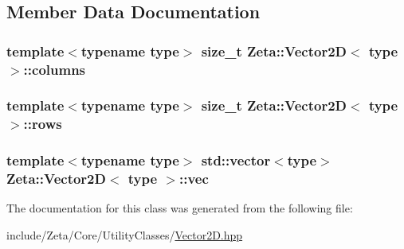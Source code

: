 \subsection{Member Data Documentation}
\hypertarget{classZeta_1_1Vector2D_abd3d1cc04c6700981eb80163689a9f26}{
\subsubsection[{columns}]{\setlength{\rightskip}{0pt plus 5cm}template$<$typename type$>$ size\+\_\+t {\bf Zeta\+::\+Vector2\+D}$<$ type $>$\+::columns\hspace{0.3cm}{\ttfamily [private]}}}\label{classZeta_1_1Vector2D_abd3d1cc04c6700981eb80163689a9f26}
\hypertarget{classZeta_1_1Vector2D_a2aca070e9e69cc69174038b3dd563826}{
\subsubsection[{rows}]{\setlength{\rightskip}{0pt plus 5cm}template$<$typename type$>$ size\+\_\+t {\bf Zeta\+::\+Vector2\+D}$<$ type $>$\+::rows\hspace{0.3cm}{\ttfamily [private]}}}\label{classZeta_1_1Vector2D_a2aca070e9e69cc69174038b3dd563826}
\hypertarget{classZeta_1_1Vector2D_ac258d2f5a75f403eab7d41fd44222f0e}{
\subsubsection[{vec}]{\setlength{\rightskip}{0pt plus 5cm}template$<$typename type$>$ std\+::vector$<$type$>$ {\bf Zeta\+::\+Vector2\+D}$<$ type $>$\+::vec\hspace{0.3cm}{\ttfamily [private]}}}\label{classZeta_1_1Vector2D_ac258d2f5a75f403eab7d41fd44222f0e}


The documentation for this class was generated from the following file\+:\begin{DoxyCompactItemize}
\item 
include/\+Zeta/\+Core/\+Utility\+Classes/\hyperlink{Vector2D_8hpp}{Vector2\+D.\+hpp}\end{DoxyCompactItemize}

